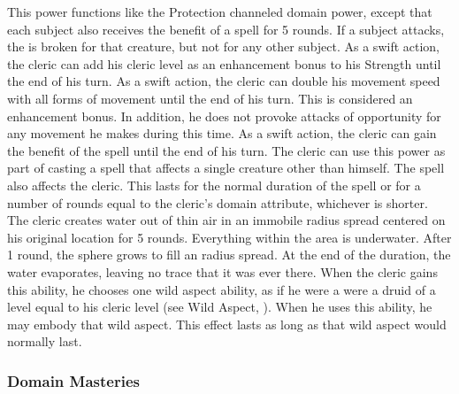  This power functions like the Protection channeled domain power, except that each subject also receives the benefit of a  spell for 5 rounds. If a subject attacks, the  is broken for that creature, but not for any other subject. 
 As a swift action, the cleric can add his cleric level as an enhancement bonus to his Strength until the end of his turn.
 As a swift action, the cleric can double his movement speed with all forms of movement until the end of his turn. This is considered an enhancement bonus. In addition, he does not provoke attacks of opportunity for any movement he makes during this time.
 As a swift action, the cleric can gain the benefit of the  spell until the end of his turn.
 The cleric can use this power as part of casting a spell that affects a single creature other than himself. The spell also affects the cleric. This lasts for the normal duration of the spell or for a number of rounds equal to the cleric's domain attribute, whichever is shorter.
 The cleric creates water out of thin air in an immobile \areamed radius spread centered on his original location for 5 rounds. Everything within the area is underwater. After 1 round, the sphere grows to fill an \arealarge radius spread. At the end of the duration, the water evaporates, leaving no trace that it was ever there.
 When the cleric gains this ability, he chooses one wild aspect ability, as if he were a were a druid of a level equal to his cleric level (see Wild Aspect, ). When he uses this ability, he may embody that wild aspect. This effect lasts as long as that wild aspect would normally last.

\subsubsection{Domain Masteries}\label{Domain Masteries}

